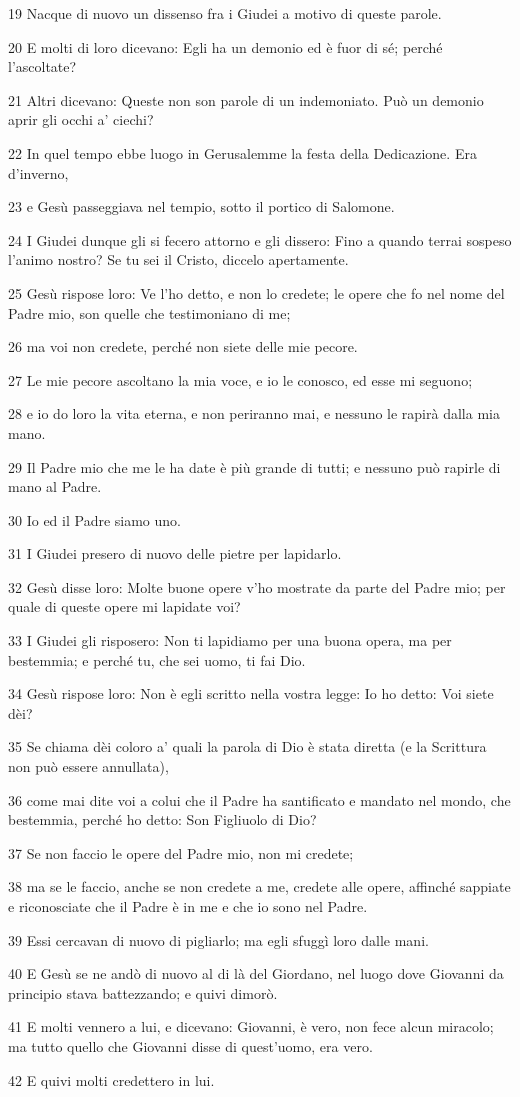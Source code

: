 \par 19 Nacque di nuovo un dissenso fra i Giudei a motivo di queste parole.
\par 20 E molti di loro dicevano: Egli ha un demonio ed è fuor di sé; perché l'ascoltate?
\par 21 Altri dicevano: Queste non son parole di un indemoniato. Può un demonio aprir gli occhi a' ciechi?
\par 22 In quel tempo ebbe luogo in Gerusalemme la festa della Dedicazione. Era d'inverno,
\par 23 e Gesù passeggiava nel tempio, sotto il portico di Salomone.
\par 24 I Giudei dunque gli si fecero attorno e gli dissero: Fino a quando terrai sospeso l'animo nostro? Se tu sei il Cristo, diccelo apertamente.
\par 25 Gesù rispose loro: Ve l'ho detto, e non lo credete; le opere che fo nel nome del Padre mio, son quelle che testimoniano di me;
\par 26 ma voi non credete, perché non siete delle mie pecore.
\par 27 Le mie pecore ascoltano la mia voce, e io le conosco, ed esse mi seguono;
\par 28 e io do loro la vita eterna, e non periranno mai, e nessuno le rapirà dalla mia mano.
\par 29 Il Padre mio che me le ha date è più grande di tutti; e nessuno può rapirle di mano al Padre.
\par 30 Io ed il Padre siamo uno.
\par 31 I Giudei presero di nuovo delle pietre per lapidarlo.
\par 32 Gesù disse loro: Molte buone opere v'ho mostrate da parte del Padre mio; per quale di queste opere mi lapidate voi?
\par 33 I Giudei gli risposero: Non ti lapidiamo per una buona opera, ma per bestemmia; e perché tu, che sei uomo, ti fai Dio.
\par 34 Gesù rispose loro: Non è egli scritto nella vostra legge: Io ho detto: Voi siete dèi?
\par 35 Se chiama dèi coloro a' quali la parola di Dio è stata diretta (e la Scrittura non può essere annullata),
\par 36 come mai dite voi a colui che il Padre ha santificato e mandato nel mondo, che bestemmia, perché ho detto: Son Figliuolo di Dio?
\par 37 Se non faccio le opere del Padre mio, non mi credete;
\par 38 ma se le faccio, anche se non credete a me, credete alle opere, affinché sappiate e riconosciate che il Padre è in me e che io sono nel Padre.
\par 39 Essi cercavan di nuovo di pigliarlo; ma egli sfuggì loro dalle mani.
\par 40 E Gesù se ne andò di nuovo al di là del Giordano, nel luogo dove Giovanni da principio stava battezzando; e quivi dimorò.
\par 41 E molti vennero a lui, e dicevano: Giovanni, è vero, non fece alcun miracolo; ma tutto quello che Giovanni disse di quest'uomo, era vero.
\par 42 E quivi molti credettero in lui.

